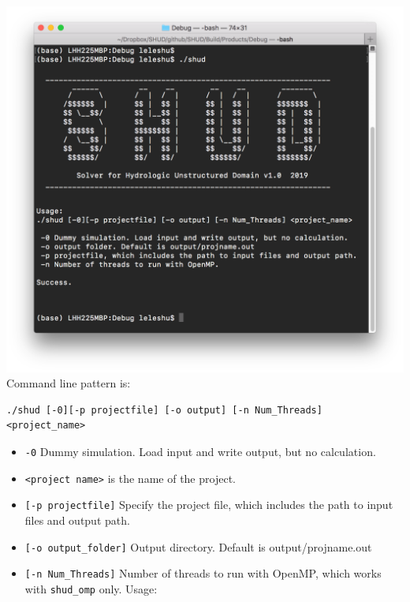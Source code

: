 \documentclass[
]{scrbook}
\begin{document}
\includegraphics{Fig/CLI.png}
Command line pattern is:

\begin{verbatim}
./shud [-0][-p projectfile] [-o output] [-n Num_Threads] <project_name>
\end{verbatim}

\begin{itemize}
\item
  \texttt{-0} Dummy simulation. Load input and write output, but no calculation.
\item
  \texttt{\textless{}project\ name\textgreater{}} is the name of the project.
\item
  \texttt{{[}-p\ projectfile{]}} Specify the project file, which includes the path to input files and output path.
\item
  \texttt{{[}-o\ output\_folder{]}} Output directory. Default is output/projname.out
\item
  \texttt{{[}-n\ Num\_Threads{]}} Number of threads to run with OpenMP, which works with \texttt{shud\_omp} only.
  Usage:
\end{itemize}
\end{document}
